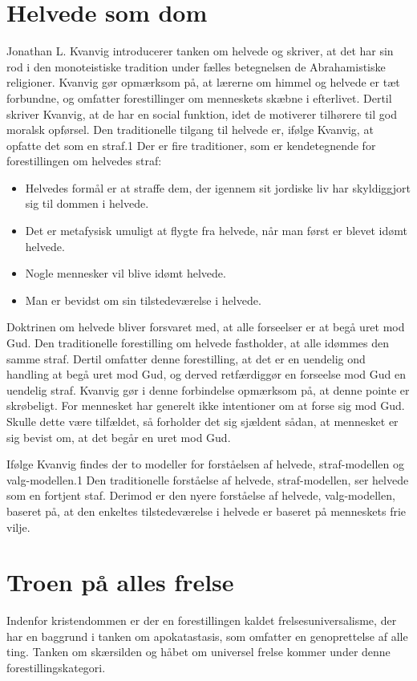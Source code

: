\section{Helvede som dom}
Jonathan L. Kvanvig introducerer tanken om helvede og skriver, at det har sin rod i den monoteistiske tradition under fælles betegnelsen de Abrahamistiske religioner. Kvanvig gør opmærksom på, at lærerne om himmel og helvede er tæt forbundne, og omfatter forestillinger om menneskets skæbne i efterlivet. Dertil skriver Kvanvig, at de har en social funktion, idet de motiverer tilhørere til god moralsk opførsel. Den traditionelle tilgang til helvede er, ifølge Kvanvig, at opfatte det som en straf.1 Der er fire traditioner, som er kendetegnende for forestillingen om helvedes straf:

\begin{itemize}
\item Helvedes formål er at straffe dem, der igennem sit jordiske liv har skyldiggjort sig til dommen i helvede.
\item Det er metafysisk umuligt at flygte fra helvede, når man først er blevet idømt helvede.
\item Nogle mennesker vil blive idømt helvede.
\item Man er bevidst om sin tilstedeværelse i helvede.
\end{itemize}

Doktrinen om helvede bliver forsvaret med, at alle forseelser er at begå uret mod Gud. Den traditionelle forestilling om helvede fastholder, at alle idømmes den samme straf. Dertil omfatter denne forestilling, at det er en uendelig ond handling at begå uret mod Gud, og derved retfærdiggør en forseelse mod Gud en uendelig straf. Kvanvig gør i denne forbindelse opmærksom på, at denne pointe er skrøbeligt. For mennesket har generelt ikke intentioner om at forse sig mod Gud. Skulle dette være tilfældet, så forholder det sig sjældent sådan, at mennesket er sig bevist om, at det begår en uret mod Gud. 

Ifølge Kvanvig findes der to modeller for forståelsen af helvede, straf-modellen og valg-modellen.1 Den traditionelle forståelse af helvede, straf-modellen, ser helvede som en fortjent staf. Derimod er den nyere forståelse af helvede, valg-modellen, baseret på, at den enkeltes tilstedeværelse i helvede er baseret på menneskets frie vilje.

\section{Troen på alles frelse}
Indenfor kristendommen er der en forestillingen kaldet frelsesuniversalisme, der har en baggrund i tanken om apokatastasis, som omfatter en genoprettelse af alle ting. Tanken om skærsilden og håbet om universel frelse kommer under denne forestillingskategori.

